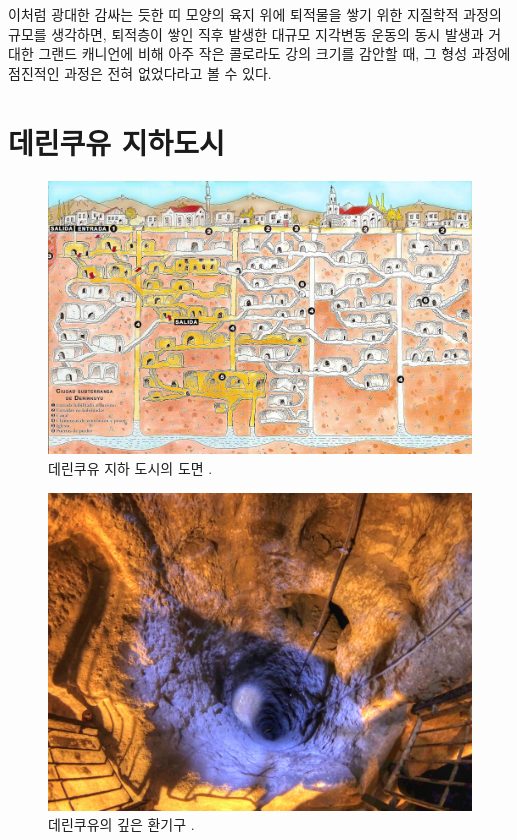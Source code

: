 \documentclass[10pt,twocolumn,letterpaper]{article}
\begin{document}
이처럼 광대한 감싸는 듯한 띠 모양의 육지 위에 퇴적물을 쌓기 위한 지질학적 과정의 규모를 생각하면, 퇴적층이 쌓인 직후 발생한 대규모 지각변동 운동의 동시 발생과 거대한 그랜드 캐니언에 비해 아주 작은 콜로라도 강의 크기를 감안할 때, 그 형성 과정에 점진적인 과정은 전혀 없었다라고 볼 수 있다.
\section{데린쿠유 지하도시}

\begin{figure}[b]
\begin{center}
   \includegraphics[width=1\linewidth]{derinkuyu.jpeg}
\end{center}
   \caption{데린쿠유 지하 도시의 도면 \cite{56}.}
\label{fig:5}
\label{fig:onecol}
\end{figure}

\begin{figure}[t]
\begin{center}
   \includegraphics[width=1\linewidth]{derinkuyu-air.jpg}
\end{center}
   \caption{데린쿠유의 깊은 환기구 \cite{53}.}
\label{fig:6}
\label{fig:onecol}
\end{figure}
\end{document}
